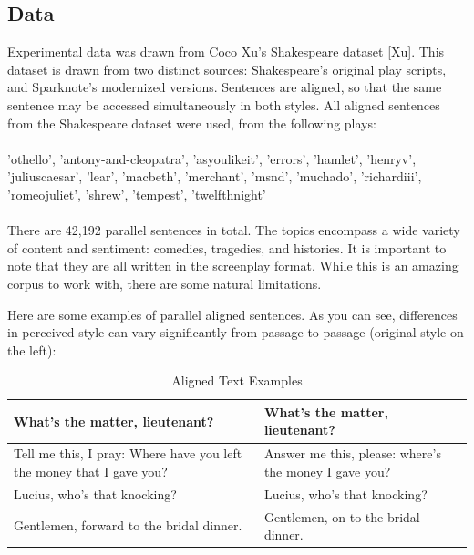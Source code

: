 \documentclass[letterpaper, 10 pt, conference]{ieeeconf}  %
\begin{document}
  \subsection{Data}
  Experimental data was drawn from Coco Xu's Shakespeare dataset [Xu]. This dataset is drawn from two distinct sources: Shakespeare's original play scripts, and Sparknote's modernized versions. Sentences are aligned, so that the same sentence may be accessed simultaneously in both styles.
  All aligned sentences from the Shakespeare dataset were used, from the following plays:\\ \\ 'othello', 'antony-and-cleopatra', 'asyoulikeit', 
                       'errors', 'hamlet', 'henryv', 'juliuscaesar', 'lear', 'macbeth', 
                       'merchant', 'msnd', 'muchado', 'richardiii', 'romeojuliet', 
                       'shrew', 'tempest', 'twelfthnight'
\\ \\
There are 42,192 parallel sentences in total. The topics encompass a wide variety of content and sentiment: comedies, tragedies, and histories. It is important to note that they are all written in the screenplay format. While this is an amazing corpus to work with, there are some natural limitations.

  Here are some examples of parallel aligned sentences. As you can see, differences in perceived style can vary significantly from passage to passage (original style on the left):


  \begin{table}[h]
    \caption{Aligned Text Examples}
    \label{table_example}
    \begin{center}
      \begin{tabular}{| p{3.5cm}  | p{3.5cm} |}
      \hline
      What's the matter, lieutenant? & What's the matter, lieutenant?\\
      \hline
      Tell me this, I pray: Where have you left the money that I gave you? & Answer me this, please: where's the money I gave you?\\
      \hline
      Lucius, who's that knocking? & Lucius, who's that knocking?\\
      \hline
      Gentlemen, forward to the bridal dinner. & Gentlemen, on to the bridal dinner.\\
      \hline
      \end{tabular}
    \end{center}
  \end{table}
\end{document}
